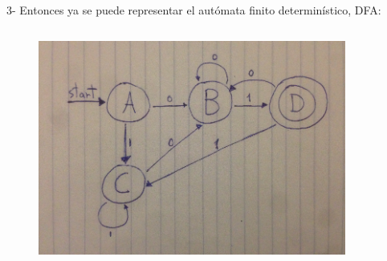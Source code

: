 \documentclass[addressstd,a4paper,10pt]{dinbrief}
\begin{document}
\begin{lstlisting}
\end{lstlisting}
\begin{lstlisting}
\end{lstlisting}
\begin{lstlisting}
\end{lstlisting}
3- Entonces ya se puede representar el aut\'omata finito determin\'istico, DFA:
\begin{lstlisting}
\end{lstlisting}
\begin{center}
\begin{figure}
\includegraphics[width=0.9\textwidth]{DFA.png} 
\centering
\end{figure}
\end{center}
\end{document}
